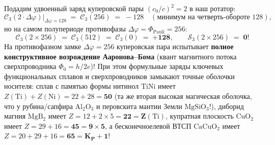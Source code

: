 Подадим удвоенный заряд куперовской пары $(c_0/c)^2 = 2$ в наш ротатор:
\[
  \mathcal{C}_3(2\cdot\Delta\varphi)\Big|_{\Delta\varphi = 128} \;=\; \mathcal{C}_3(256) \;=\; -128 \quad (\text{минимум на четверть-обороте } 128),
\]
но на самом полупериоде противофазы $\Delta\varphi = \Phi_{\mathrm{Pauli}} = 256$:
\begin{equation}
  \label{eq:course-cooper-revival}
  \mathcal{C}_3(2\times 256) \;=\; \mathcal{C}_3(512) \;=\; \mathcal{C}_3(0) \;=\; \mathbf{+128},
  \qquad
  \mathcal{S}_3(2\times 256) \;=\; \mathbf{0}!
\end{equation}
На противофазном замке $\Delta\varphi = 256$ куперовская пара испытывает \textbf{полное конструктивное возрождение Ааронова--Бома} (квант магнитного потока сверхпроводника $\Phi_0 = h / 2e$)! При этом формульные заряды ключевых функциональных сплавов и сверхпроводников замыкают точные оболочки носителя: сплав с памятью формы нитинол $\mathrm{TiNi}$ имеет $Z(\mathrm{Ti})+Z(\mathrm{Ni}) = 22 + 28 = \mathbf{50}$ (та же вторая высокая магическая оболочка, что у рубина/сапфира $\mathrm{Al_2O_3}$ и перовскита мантии Земли $\mathrm{MgSiO_3}$!), диборид магния $\mathrm{MgB_2}$ имеет $Z = 12 + 2\times 5 = \mathbf{22 = Z(\mathrm{Ti})}$, купратная плоскость $\mathrm{CuO_2}$ имеет $Z = 29 + 16 = \mathbf{45 = 9\times 5}$, а бесконечноелевой ВТСП $\mathrm{CaCuO_2}$ имеет $Z = 20 + 29 + 16 = \mathbf{65 = K_P + 1}$!

